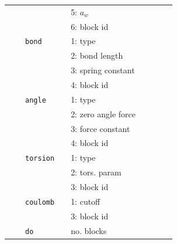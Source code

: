 \documentclass[11pt]{article}
\begin{document}
\begin{center}
\begin{tabular}{cclclclll}
                                   && && 5: $a_w$ && \\
                                   && && 6: block id \\ 
                    && \verb!bond! && 1: type && \\  
                    &&             && 2: bond length && \\
                                   &&             && 3: spring constant && \\
                                   && && 4: block id \\
                    && \verb!angle!&& 1: type && \\  
                    &&             && 2: zero angle force && \\
                                   &&             && 3: force constant && \\
                                   && && 4: block id \\
                    && \verb!torsion! && 1: type && \\  
                                   &&             && 2: tors. param && \\
                                   && && 3: block id \\
                   && \verb!coulomb! && 1: cutoff && \\  
                   &&                && 3: block id && \\
                   && \verb!do! && no. blocks && \\
  \end{tabular}

\end{center}
\end{document}
